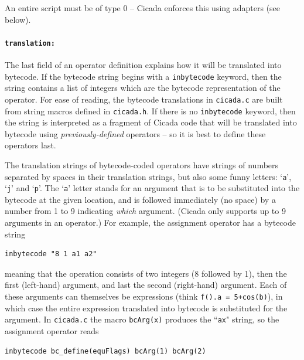 \documentclass{article}
\newenvironment{code}{
       \begin{list}{}{
               \setlength{\leftmargin}{.4in}
               \setlength{\rightmargin}{0in}
               \setlength{\topsep}{.2in}
       }
       \small
       \item[] }
       { \end{list}   }
\begin{document}
An entire script must be of type 0 -- Cicada enforces this using adapters (see below).



\paragraph{\texttt{translation:}}  The last field of an operator definition explains how it will be translated into bytecode.  If the bytecode string begins with a \verb#inbytecode# keyword, then the string contains a list of integers which are the bytecode representation of the operator.  For ease of reading, the bytecode translations in \verb#cicada.c# are built from string macros defined in \verb#cicada.h#.  If there is no \verb#inbytecode# keyword, then the string is interpreted as a fragment of Cicada code that will be translated into bytecode using \emph{previously-defined} operators -- so it is best to define these operators last.

The translation strings of bytecode-coded operators have strings of numbers separated by spaces in their translation strings, but also some funny letters:  `\verb#a#', `\verb#j#' and `\verb#p#'.  The `\verb#a#' letter stands for an argument that is to be substituted into the bytecode at the given location, and is followed immediately (no space) by a number from 1 to 9 indicating \emph{which} argument.  (Cicada only supports up to 9 arguments in an operator.)  For example, the assignment operator has a bytecode string

\begin{code} \begin{verbatim}
inbytecode "8 1 a1 a2"
\end{verbatim} \end{code}

\noindent meaning that the operation consists of two integers (8 followed by 1), then the first (left-hand) argument, and last the second (right-hand) argument.  Each of these arguments can themselves be expressions (think \verb#f().a = 5+cos(b)#), in which case the entire expression translated into bytecode is substituted for the argument.  In \verb#cicada.c# the macro \verb#bcArg(x)# produces the ``\verb#ax#" string, so the assignment operator reads

\begin{code} \begin{verbatim}
inbytecode bc_define(equFlags) bcArg(1) bcArg(2)
\end{verbatim} \end{code}
\end{document}
